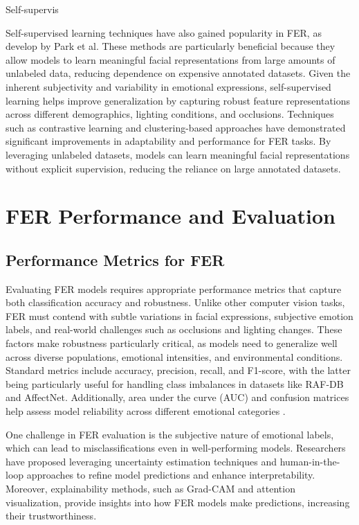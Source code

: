 Self-supervis

Self-supervised learning techniques have also gained popularity in FER, as develop by Park et al\cite{park_what_2023}. These methods are particularly beneficial because they allow models to learn meaningful facial representations from large amounts of unlabeled data, reducing dependence on expensive annotated datasets. Given the inherent subjectivity and variability in emotional expressions, self-supervised learning helps improve generalization by capturing robust feature representations across different demographics, lighting conditions, and occlusions. Techniques such as contrastive learning and clustering-based approaches have demonstrated significant improvements in adaptability and performance for FER tasks. By leveraging unlabeled datasets, models can learn meaningful facial representations without explicit supervision, reducing the reliance on large annotated datasets. 



\section{FER Performance and Evaluation}


\subsection{Performance Metrics for FER}

Evaluating FER models requires appropriate performance metrics that capture both classification accuracy and robustness. Unlike other computer vision tasks, FER must contend with subtle variations in facial expressions, subjective emotion labels, and real-world challenges such as occlusions and lighting changes. These factors make robustness particularly critical, as models need to generalize well across diverse populations, emotional intensities, and environmental conditions. Standard metrics include accuracy, precision, recall, and F1-score, with the latter being particularly useful for handling class imbalances in datasets like RAF-DB and AffectNet. Additionally, area under the curve (AUC) and confusion matrices help assess model reliability across different emotional categories \cite{ma_facial_2023}.

One challenge in FER evaluation is the subjective nature of emotional labels, which can lead to misclassifications even in well-performing models. Researchers have proposed leveraging uncertainty estimation techniques and human-in-the-loop approaches to refine model predictions and enhance interpretability. Moreover, explainability methods, such as Grad-CAM and attention visualization, provide insights into how FER models make predictions, increasing their trustworthiness.

